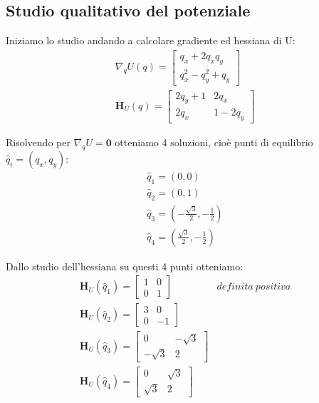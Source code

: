 \documentclass[a4paper]{article}
\numberwithin{equation}{section}
\numberwithin{figure}{section}
\newcommand{\hess}[1]{\mathbf{H}_{#1}}
\begin{document}
\subsection{Studio qualitativo del potenziale}

Iniziamo lo studio andando a calcolare gradiente ed hessiana di U:
\begin{eqnarray}
	\nabla_q U(q)= 
	\begin{bmatrix}
		q_x + 2q_xq_y\\
		q_x^2 - q_y^2 + q_y
	\end{bmatrix}\\[0.2cm]
% 
	\hess{U}(q)=
	\begin{bmatrix}
		2q_y + 1& 2q_x\\
		2q_x& 1 - 2q_y
	\end{bmatrix}
\end{eqnarray}

Risolvendo per $\nabla_q U = \mathbf{0}$ otteniamo 4 soluzioni, cioè punti di equilibrio
$\hat{q}_i = (q_x, q_y)$:
\begin{eqnarray*}
	\hat{q}_1 = (0,0)\\
	\hat{q}_2 = (0,1)\\
	\hat{q}_3 = (-\frac{\sqrt{3}}{2}, -\frac{1}{2})\\
	\hat{q}_4 = (\frac{\sqrt{3}}{2}, -\frac{1}{2})
\end{eqnarray*}

Dallo studio dell'hessiana su questi 4 punti otteniamo:
\begin{eqnarray*}
\hess{U}(\hat{q}_1) =
	\begin{bmatrix}
		1& 0\\ 0 & 1
	\end{bmatrix} &definita\ positiva\\
%
\hess{U}(\hat{q}_2) = 
	\begin{bmatrix}
		3 & 0 \\ 0 & -1	
	\end{bmatrix}\\
%
\hess{U}(\hat{q}_3) = 
	\begin{bmatrix}
		0 & -\sqrt{3} \\
		-\sqrt{3} & 2
	\end{bmatrix}\\
%
\hess{U}(\hat{q}_4) = 
	\begin{bmatrix}
		0 & \sqrt{3} \\
		\sqrt{3} & 2
	\end{bmatrix}\\
\end{eqnarray*}
\end{document}
